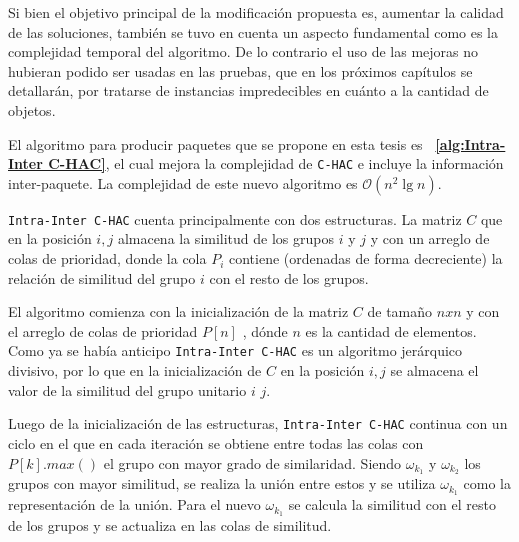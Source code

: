 Si bien el objetivo principal de la modificación propuesta es, aumentar la calidad de las soluciones, también se tuvo en cuenta un aspecto fundamental como es la complejidad temporal del algoritmo. De lo contrario el uso de las mejoras no hubieran podido ser usadas en las pruebas, que en los próximos capítulos se detallarán, por tratarse de instancias impredecibles en cuánto a la cantidad de objetos.

El algoritmo para producir paquetes que se propone en esta tesis es \textbf{~\autoref{alg:Intra-Inter C-HAC}}, el cual mejora la complejidad de  \texttt{C-HAC} e incluye la información inter-paquete. La complejidad de este nuevo algoritmo es $\mathcal{O}(n^{2}\lg n)$. 

\texttt{Intra-Inter C-HAC} cuenta principalmente con dos estructuras. La matriz $C$ que en la posición $i,j$ almacena la similitud de los grupos $i$ y $j$ y con un arreglo de colas de prioridad, donde la cola $P_i$ contiene (ordenadas de forma decreciente) la relación de similitud del grupo $i$ con el resto de los grupos.

El algoritmo comienza con la inicialización de la matriz $C$ de tamaño $n x n$ y con el arreglo de colas de prioridad $P\left[n\right]$ , dónde $n$ es la cantidad de elementos. Como ya se había anticipo \texttt{Intra-Inter C-HAC} es un algoritmo jerárquico divisivo, por lo que en la inicialización de $C$ en la posición $i,j$ se almacena el valor de la similitud del grupo unitario $i$ $j$.

Luego de la inicialización de las estructuras, \texttt{Intra-Inter C-HAC} continua con un ciclo en el que en cada iteración se obtiene entre todas las colas con $P\left[k\right].max()$ el grupo con mayor grado de similaridad. Siendo $\omega_{k_{1}}$ y $\omega_{k_{2}}$ los grupos con mayor similitud, se realiza la unión entre estos y se utiliza $\omega_{k_{1}}$  como la representación de la unión. Para el nuevo  $\omega_{k_{1}}$ se calcula la similitud con el resto de los grupos y se actualiza en las colas de similitud.

